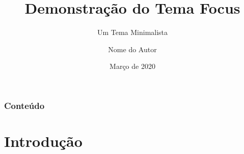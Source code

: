 \documentclass[aspectratio=169]{beamer}
\title{Demonstração do Tema Focus}
\subtitle{Um Tema Minimalista}
\author{Nome do Autor}
\institute{Universidade Federal de Uberlândia}
\date{Março de 2020}
\begin{document}
\begin{frame}
	\maketitle
\end{frame}
\begin{frame}
	\frametitle{Conteúdo} 
	\tableofcontents 
\end{frame}
\section{Introdução}
\begin{frame}{}
	\sectionpage
\end{frame}
\end{document}
